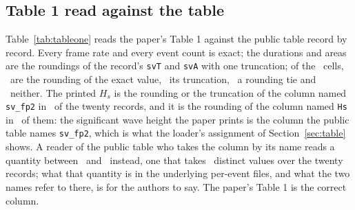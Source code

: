 \documentclass[preprint,11pt,authoryear]{elsarticle}
\begin{document}
\subsection{Table 1 read against the table}\label{sec:tableone}
Table~\ref{tab:tableone} reads the paper's Table 1 against the public table record by record. Every frame rate and every event count is exact; the durations and areas are the roundings of the record's \texttt{svT} and \texttt{svA} with one truncation; of the \TOneCells\ cells, \TOneReproduced\ are the rounding of the exact value, \TOneTruncation\ its truncation, \TOneTies\ a rounding tie and \TOneNot\ neither. The printed $H_s$ is the rounding or the truncation of the column named \texttt{sv\_fp2} in \TOneHsSv\ of the twenty records, and it is the rounding of the column named \texttt{Hs} in \TOneHsNamed\ of them: the significant wave height the paper prints is the column the public table names \texttt{sv\_fp2}, which is what the loader's assignment of Section~\ref{sec:table} shows. A reader of the public table who takes the column by its name reads a quantity between \HsNamedLo\ and \HsNamedHi\ instead, one that takes \HsNamedDistinct\ distinct values over the twenty records; what that quantity is in the underlying per-event files, and what the two names refer to there, is for the authors to say. The paper's Table 1 is the correct column.

\begin{table}[p]
\centering\scriptsize
\caption{The paper's Table 1 \citep{guimaraes2026} read against the public table: the printed frame rate, duration, reconstructed area and event count $N_b$; the printed $H_s$ beside the record's column named \texttt{sv\_fp2} and its column named \texttt{Hs}; the printed $T_p$ and $U_{10}$ beside the record's $1/\texttt{sv\_fp}$ and \texttt{wnd}. A printed cell with no mark is the rounding of the exact value; $^{\mathrm{t}}$ its truncation; $^{\mathrm{b}}$ a rounding tie; $^{\mathrm{n}}$ neither.}
\label{tab:tableone}
\end{table}
\end{document}
